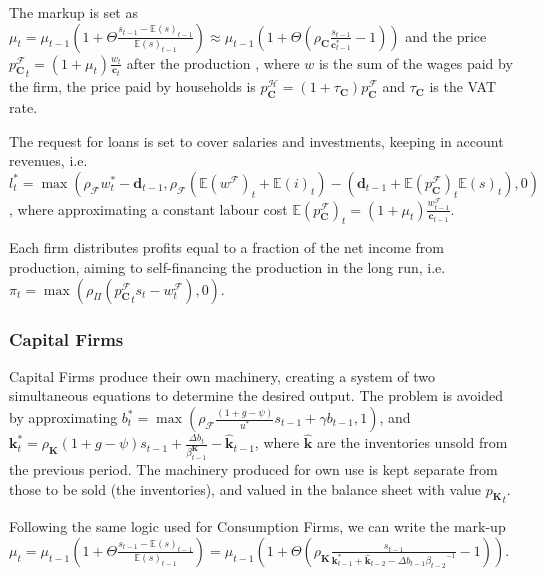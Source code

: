 \documentclass[a4paper, headings=standardclasses]{scrartcl}
\begin{document}
The markup is set as $\mu_t = \mu_{t-1}(1 + \Theta \frac{s_{t-1}-{\mathbb{E}(s)}_{t-1}}{{\mathbb{E}(s)}_{t-1}}) \approx \mu_{t-1}(1+\Theta(\rho_\mathbf{C}\frac{s_{t-1}}{\mathbf{c}^*_{t-1}}-1))$ and the price ${p^{\mathcal{F}}_\mathbf{C}}_t = (1+\mu_t)\frac{w_t}{\mathbf{c}_t}$ after the production \parencite[like in][]{caiani2016}, where $w$ is the sum of the wages paid by the firm, the price paid by households is $p^\mathcal{H}_\mathbf{C} = (1+\tau_\mathbf{C})p^\mathcal{F}_\mathbf{C}$ and $\tau_\mathbf{C}$ is the VAT rate.

The request for loans is set to cover salaries and investments, keeping in account revenues, i.e. $l_t^* = \max(\rho_\mathcal{F} w_t^* - \mathbf{d}_{t-1}, \rho_\mathcal{F} (\mathbb{E}(w^\mathcal{F})_t + \mathbb{E}(i)_t) - (\mathbf{d}_{t-1} + {\mathbb{E}(p^\mathcal{F}_{\mathbf{C}})}_t {\mathbb{E}(s)}_t), 0)$, where approximating a constant labour cost ${\mathbb{E}(p^\mathcal{F}_\mathbf{C})}_t = (1+\mu_t)\frac{w^\mathcal{F}_{t-1}}{\mathbf{c}_{t-1}}$.

Each firm distributes profits equal to a fraction of the net income from production, aiming to self-financing the production in the long run, i.e.  $\pi_t = \max(\rho_\Pi ({p^\mathcal{F}_\mathbf{C}}_t s_t - w^\mathcal{F}_t), 0)$.


\subsubsection{Capital Firms}
Capital Firms produce their own machinery, creating a system of two simultaneous equations to determine the desired output.
The problem is avoided by approximating $b^*_t = \max(\rho_\mathcal{F}\frac{(1+g-\psi)}{u^*}s_{t-1} + \gamma b_{t-1}, 1)$, and $\mathbf{k}_t^* = \rho_\mathbf{K}(1+g-\psi)s_{t-1} + \frac{{\Delta b}_t}{\beta^\mathbf{K}_{t-1}} - \hat{\mathbf{k}}_{t-1}$, where $\hat{\mathbf{k}}$ are the inventories unsold from the previous period. The machinery produced for own use is kept separate from those to be sold (the inventories), and valued in the balance sheet with value ${p_\mathbf{K}}_t$.

Following the same logic used for Consumption Firms, we can write the mark-up $\mu_t = \mu_{t-1}(1 + \Theta \frac{s_{t-1}-{\mathbb{E}(s)}_{t-1}}{{\mathbb{E}(s)}_{t-1}}) = \mu_{t-1}(1+\Theta(\rho_\mathbf{K}\frac{s_{t-1}}{\mathbf{k}^*_{t-1} + \hat{\mathbf{k}}_{t-2} - \Delta b_{t-1}{\beta_{t-2}}^{-1}}-1))$.
\end{document}
